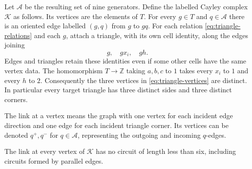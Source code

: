 Let $\mathcal A$ be the resulting set of nine generators.  Define the
labelled Cayley complex $\mathcal K$ as follows.  Its vertices are the
elements of $T$.  For every $g\in T$ and $q\in\mathcal A$ there is an
oriented edge labelled $(g,q)$ from $g$ to $gq$.  For each relation
\eqref{eq:triangle-relations} and each $g$, attach a triangle, with its
own cell identity, along the edges joining
\begin{equation}\label{eq:triangle-vertices}
  g,\quad gx_i,\quad gh.
\end{equation}
Edges and triangles retain these identities even if some other cells
have the same vertex data.  The homomorphism $T\to\mathbb Z$ taking
$a,b,c$ to $1$ takes every $x_i$ to $1$ and every $h$ to $2$.
Consequently the three vertices in \eqref{eq:triangle-vertices} are
distinct.  In particular every target triangle has three distinct
sides and three distinct corners.

The link at a vertex means the graph with one vertex for each incident
edge direction and one edge for each incident triangle corner.  Its
vertices can be denoted $q^+,q^-$ for $q\in\mathcal A$, representing
the outgoing and incoming $q$-edges.

\begin{lemma}\label{lem:link-girth}
The link at every vertex of $\mathcal K$ has no circuit of length
less than six, including circuits formed by parallel edges.
\end{lemma}

